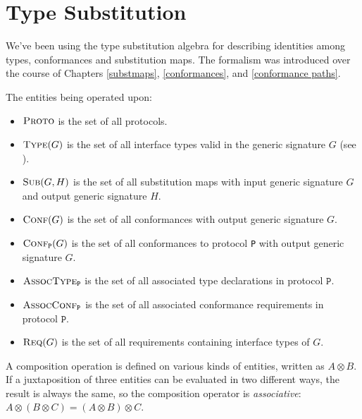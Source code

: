 \documentclass[../generics]{subfiles}
\begin{document}
\chapter{Type Substitution}\label{notation summary}

We've been using the type substitution algebra for describing identities among types, conformances and substitution maps. The formalism was introduced over the course of Chapters \ref{substmaps}, \ref{conformances}, and \ref{conformance paths}.

The entities being operated upon:
\begin{itemize}
\item {}$\textsc{Proto}$ is the set of all protocols.
\item {}$\textsc{Type}({G})$ is the set of all interface types valid in the generic signature $G$ (see ).
\item {}$\textsc{Sub}({G, H})$ is the set of all substitution maps with input generic signature $G$ and output generic signature $H$.
\item {}$\textsc{Conf}({G})$ is the set of all conformances with output generic signature $G$.
\item {}$\textsc{Conf}_{\texttt{P}}({G})$ is the set of all conformances to protocol \texttt{P} with output generic signature $G$.
\item {}$\textsc{AssocType}_{\texttt{P}}$ is the set of all associated type declarations in protocol $\texttt{P}$.
\item {}$\textsc{AssocConf}_{\texttt{P}}$ is the set of all associated conformance requirements in protocol $\texttt{P}$.
\item {}$\textsc{Req}({G})$ is the set of all requirements containing interface types of $G$.
\end{itemize}
A composition operation is defined on various kinds of entities, written as \index{$\otimes$}$A \otimes B$. If a juxtaposition of three entities can be evaluated in two different ways, the result is always the same, so the composition operator is \emph{associative}: $A\otimes (B\otimes C) = (A\otimes B) \otimes C$.
\end{document}
